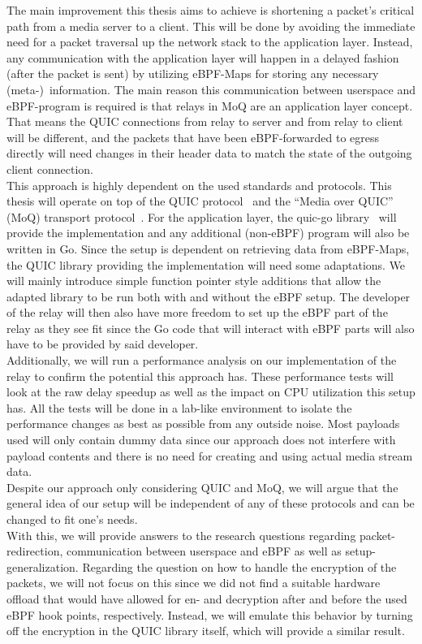 \noindent
The main improvement this thesis aims to achieve is shortening a packet's critical path from a media server to a client.
This will be done by avoiding the immediate need for a packet traversal up the network stack to the application layer.
Instead, any communication with the application layer will happen in a delayed fashion (after the packet is sent) by utilizing 
eBPF-Maps for storing any necessary (meta-)~information.
The main reason this communication between userspace and eBPF-program is required is that relays in MoQ are an application layer concept.
That means the QUIC connections from relay to server and from relay to client will be different, and the packets that have been eBPF-forwarded to egress directly will need changes in their header data to match the state of the outgoing client connection.  
\\
This approach is highly dependent on the used standards and protocols.
This thesis will operate on top of the QUIC protocol~\parencite{rfc-9000} and the ``Media over QUIC'' (MoQ) 
transport protocol~\parencite{draft-moqtransport}.
For the application layer, the quic-go library~\parencite{quic-go-repo} will provide the implementation and 
any additional (non-eBPF) program will also be written in Go.
Since the setup is dependent on retrieving data from eBPF-Maps, the QUIC library providing the implementation 
will need some adaptations.
We will mainly introduce simple function pointer style additions that allow the adapted library to be run 
both with and without the eBPF setup.
The developer of the relay will then also have more freedom to set up the eBPF part of the relay as they see fit
since the Go code that will interact with eBPF parts will also have to be provided by said developer.
\\
Additionally, we will run a performance analysis on our implementation of the relay to confirm the potential this 
approach has.
These performance tests will look at the raw delay speedup as well as the impact on CPU utilization this 
setup has.
All the tests will be done in a lab-like environment to isolate the performance changes as best as possible
from any outside noise.
Most payloads used will only contain dummy data since our approach does not interfere with payload contents 
and there is no need for creating and using actual media stream data.
\\
Despite our approach only considering QUIC and MoQ, we will argue that the general idea of our setup will be independent of
any of these protocols and can be changed to fit one's needs.
\\
With this, we will provide answers to the research questions regarding packet-redirection, communication between userspace and eBPF
as well as setup-generalization.
Regarding the question on how to handle the encryption of the packets, we will not focus on this since we did not find a suitable
hardware offload that would have allowed for en- and decryption after and before the used eBPF hook points, respectively.
Instead, we will emulate this behavior by turning off the encryption in the QUIC library itself, which will provide a similar result.

